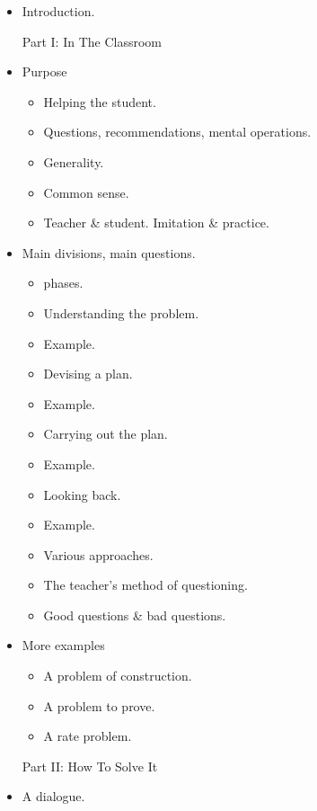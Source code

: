 \documentclass{article}
\begin{document}
\begin{enumerate}
\begin{itemize}
		I know of no better remedy for such presumptions than {\sc Polya}'s counsel: before trying to solve a problem, the students should demonstrate his or her understanding of its statement, preferably to a real teacher, but in lieu of that, to an imagined one. Experienced mathematicians know that often the hardest part of researching a problem is understanding precisely what that problem says. They often follow {\sc Polya}'s wise advice: ``If you can't solve a problem, then there is an easier problem you can't solve: find it.''

		Readers who learn from this book will also want to learn about its author's life.
		\item {\sf Introduction.}

		Part I: In The Classroom
		\item {\sf Purpose}
		\begin{itemize}
			\item {\sf Helping the student.}
			\item {\sf Questions, recommendations, mental operations.}
			\item {\sf Generality.}
			\item {\sf Common sense.}
			\item {\sf Teacher \& student. Imitation \& practice.}
		\end{itemize}
		\item {\sf Main divisions, main questions.}
		\begin{itemize}
			\item { phases.}
			\item {\sf Understanding the problem.}
			\item {\sf Example.}
			\item {\sf Devising a plan.}
			\item {\sf Example.}
			\item {\sf Carrying out the plan.}
			\item {\sf Example.}
			\item {\sf Looking back.}
			\item {\sf Example.}
			\item {\sf Various approaches.}
			\item {\sf The teacher's method of questioning.}
			\item {\sf Good questions \& bad questions.}
		\end{itemize}
		\item {\sf More examples}
		\begin{itemize}
			\item {\sf A problem of construction.}
			\item {\sf A problem to prove.}
			\item {\sf A rate problem.}
		\end{itemize}
		Part II: How To Solve It
		\item {\sf A dialogue.}


\end{itemize}
\end{enumerate}
\end{document}
